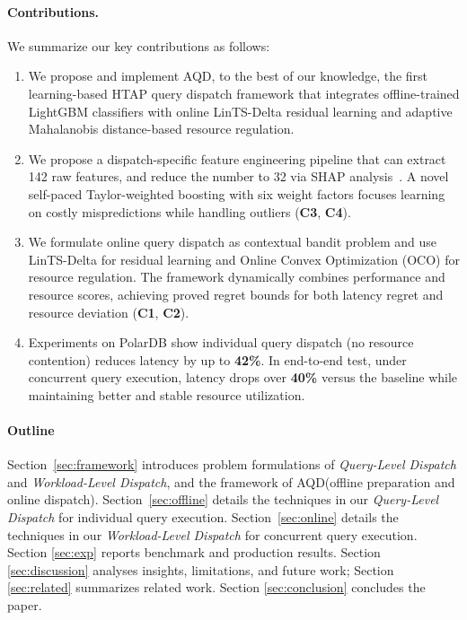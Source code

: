 \documentclass[sigconf, nonacm]{acmart}
\newcommand{\dispatcher}{AQD\xspace}
\begin{document}
\paragraph{Contributions.}
We summarize our key contributions as follows:
\begin{enumerate}[leftmargin=*]
    \item We propose and implement \dispatcher, to the best of our knowledge, the first learning-based HTAP query dispatch framework that integrates offline-trained LightGBM classifiers with online LinTS-Delta residual learning and adaptive Mahalanobis distance-based resource regulation. %
    
    \item We propose a dispatch-specific feature engineering pipeline that can extract 142 raw features, and reduce the number to 32 via SHAP analysis~\cite{lundberg2017unified,lundberg2019explainable}. A novel self-paced Taylor-weighted boosting with six weight factors focuses learning on costly mispredictions while handling outliers (\textbf{C3}, \textbf{C4}).
    
    \item We formulate online query dispatch as contextual bandit problem and use LinTS-Delta for residual learning and Online Convex Optimization (OCO) for resource regulation. The framework dynamically combines performance and resource scores, achieving proved regret bounds for both latency regret and resource deviation (\textbf{C1}, \textbf{C2}).
    
    \item Experiments on PolarDB show individual query dispatch (no resource contention) reduces latency by up to \textbf{42\%}. In end-to-end test, under concurrent query execution, latency drops over \textbf{40\%} versus the baseline while maintaining better and stable resource utilization. %
\end{enumerate}


\paragraph{Outline} 
Section~\ref{sec:framework} introduces problem formulations of \textit{Query-Level Dispatch} and \textit{Workload-Level Dispatch}, and the framework of \dispatcher (offline preparation and online dispatch).
Section~\ref{sec:offline} details the techniques in our \textit{Query-Level Dispatch} for individual query execution.
Section~\ref{sec:online} details the techniques in our \textit{Workload-Level Dispatch} for concurrent query execution.
Section \ref{sec:exp} reports benchmark and production results.
Section \ref{sec:discussion} analyses insights, limitations, and future work; Section \ref{sec:related} summarizes related work.
Section \ref{sec:conclusion} concludes the paper.
\end{document}
